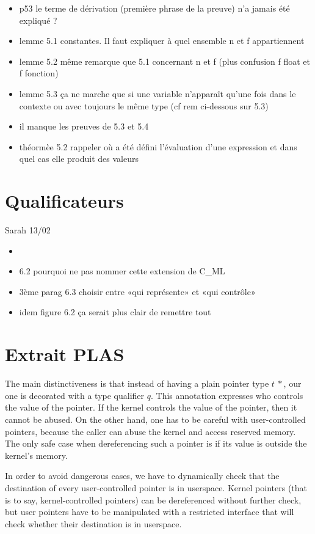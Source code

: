 \begin{itemize}
\item
  p53 le terme de dérivation (première phrase de la preuve) n'a jamais
  été expliqué ?
\item
  lemme 5.1 constantes. Il faut expliquer à quel ensemble n et f
  appartiennent
\item
  lemme 5.2 même remarque que 5.1 concernant n et f (plus confusion f
  float et f fonction)
\item
  lemme 5.3 ça ne marche que si une variable n'apparaît qu'une fois dans
  le contexte ou avec toujours le même type (cf rem ci-dessous sur 5.3)
\item
  il manque les preuves de 5.3 et 5.4
\item
  théormèe 5.2 rappeler où a été défini l'évaluation d'une expression et
  dans quel cas elle produit des valeurs
\end{itemize}%

\section{Qualificateurs}

Sarah 13/02

\begin{itemize}
\item
\item
  6.2 pourquoi ne pas nommer cette extension de C\_ML
\item
  3ème parag 6.3 choisir entre «qui représente» et «qui contrôle»
\item
  idem figure 6.2 ça serait plus clair de remettre tout
\end{itemize}

\section*{Extrait PLAS}

The main distinctiveness is that instead of having a plain pointer type
$t~*$, our one is decorated with a type qualifier $q$. This annotation expresses
who controls the value of the pointer. If the kernel controls the value of the
pointer, then it cannot be abused. On the other hand, one has to be careful
with user-controlled pointers, because the caller can abuse the kernel and
access reserved memory. The only safe case when dereferencing such a pointer is
if its value is outside the kernel's memory.

In order to avoid dangerous cases, we have to dynamically check that the
destination of every user-controlled pointer is in userspace. Kernel pointers
(that is to say, kernel-controlled pointers) can be dereferenced without further
check, but user pointers have to be manipulated with a restricted interface that
will check whether their destination is in userspace.

